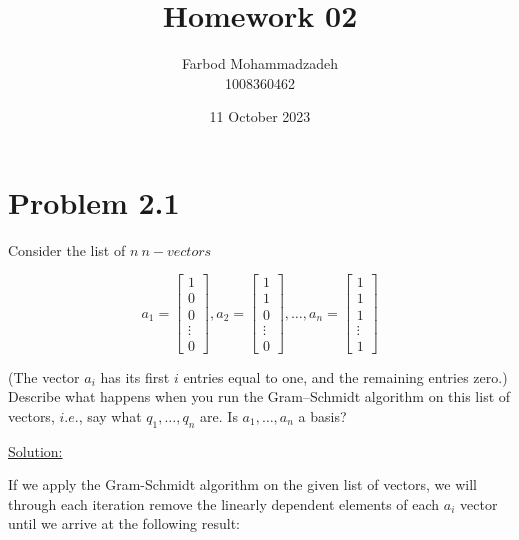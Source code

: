 \documentclass[20pt]{article}
\title{Homework 02}
\author{Farbod Mohammadzadeh\\1008360462}
\date{11 October 2023}
\begin{document}
\Large
\maketitle

\newpage

\section*{Problem 2.1}

Consider the list of $n \ n-vectors$

\begin{equation}
    a_1 = \begin{bmatrix}
        1      \\
        0      \\
        0      \\
        \vdots \\
        0
    \end{bmatrix}, a_2 = \begin{bmatrix}
        1      \\
        1      \\
        0      \\
        \vdots \\
        0
    \end{bmatrix}, \dots, a_n = \begin{bmatrix}
        1      \\
        1      \\
        1      \\
        \vdots \\
        1
    \end{bmatrix}
\end{equation}

(The vector $a_i$ has its first $i$ entries equal to one, and the remaining entries zero.) Describe
what happens when you run the Gram–Schmidt algorithm on this list of vectors, $i.e.$, say
what $q_1, \dots , q_n$ are. Is $a_1, \dots , a_n$ a basis?

\underline{Solution:}

If we apply the Gram-Schmidt algorithm on the given list of vectors, we will through each iteration remove the linearly dependent elements of each $a_i$ vector until we arrive at the following result:
\end{document}
